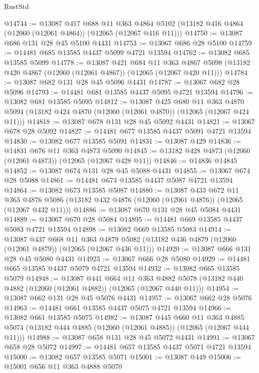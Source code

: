 \begin{lexlean}{RustStd}
\begin{coremodule}
@14744 := @13087
    @417
    @688
    @11
    @363
    @4864
    @5102
    (@13182 @416 @4864 (@12060 (@12061 @4864)) (@12065 (@12067 @416 @11)))
@14750 := @13087 @686 @131 @28 @45 @5100 @4431
@14753 := @13067 @686 @28 @5100
@14759 := @14481 @685 @13585 @4437 @5099 @4721 @13594
@14762 := @13082 @685 @13585 @5099
@14778 := @13087
    @421
    @684
    @11
    @363
    @4867
    @5098
    (@13182 @420 @4867 (@12060 (@12061 @4867)) (@12065 (@12067 @420 @11)))
@14784 := @13087 @682 @131 @28 @45 @5096 @4431
@14787 := @13067 @682 @28 @5096
@14793 := @14481 @681 @13585 @4437 @5095 @4721 @13594
@14796 := @13082 @681 @13585 @5095
@14812 := @13087
    @425
    @680
    @11
    @363
    @4870
    @5094
    (@13182 @424 @4870 (@12060 (@12061 @4870)) (@12065 (@12067 @424 @11)))
@14818 := @13087 @678 @131 @28 @45 @5092 @4431
@14821 := @13067 @678 @28 @5092
@14827 := @14481 @677 @13585 @4437 @5091 @4721 @13594
@14830 := @13082 @677 @13585 @5091
@14831 := @13087 @429
@14836 := @14831 @676 @11 @363 @4873 @5090
@14845 := @13182 @428 @4873 (@12060 (@12061 @4873)) (@12065 (@12067 @428 @11))
@14846 := @14836 @14845
@14852 := @13087 @674 @131 @28 @45 @5088 @4431
@14855 := @13067 @674 @28 @5088
@14861 := @14481 @673 @13585 @4437 @5087 @4721 @13594
@14864 := @13082 @673 @13585 @5087
@14880 := @13087
    @433
    @672
    @11
    @363
    @4876
    @5086
    (@13182 @432 @4876 (@12060 (@12061 @4876)) (@12065 (@12067 @432 @11)))
@14886 := @13087 @670 @131 @28 @45 @5084 @4431
@14889 := @13067 @670 @28 @5084
@14895 := @14481 @669 @13585 @4437 @5083 @4721 @13594
@14898 := @13082 @669 @13585 @5083
@14914 := @13087
    @437
    @668
    @11
    @363
    @4879
    @5082
    (@13182 @436 @4879 (@12060 (@12061 @4879)) (@12065 (@12067 @436 @11)))
@14920 := @13087 @666 @131 @28 @45 @5080 @4431
@14923 := @13067 @666 @28 @5080
@14929 := @14481 @665 @13585 @4437 @5079 @4721 @13594
@14932 := @13082 @665 @13585 @5079
@14948 := @13087
    @441
    @664
    @11
    @363
    @4882
    @5078
    (@13182 @440 @4882 (@12060 (@12061 @4882)) (@12065 (@12067 @440 @11)))
@14954 := @13087 @662 @131 @28 @45 @5076 @4431
@14957 := @13067 @662 @28 @5076
@14963 := @14481 @661 @13585 @4437 @5075 @4721 @13594
@14966 := @13082 @661 @13585 @5075
@14982 := @13087
    @445
    @660
    @11
    @363
    @4885
    @5074
    (@13182 @444 @4885 (@12060 (@12061 @4885)) (@12065 (@12067 @444 @11)))
@14988 := @13087 @658 @131 @28 @45 @5072 @4431
@14991 := @13067 @658 @28 @5072
@14997 := @14481 @657 @13585 @4437 @5071 @4721 @13594
@15000 := @13082 @657 @13585 @5071
@15001 := @13087 @449
@15006 := @15001 @656 @11 @363 @4888 @5070

\end{coremodule}
\end{lexlean}
